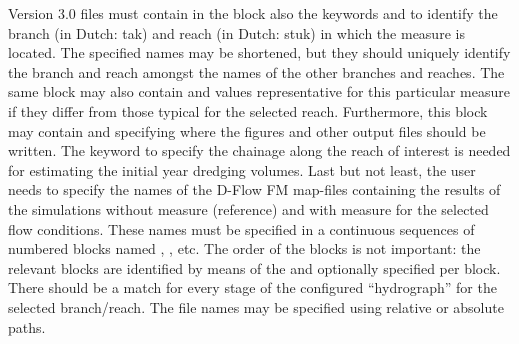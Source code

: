 Version 3.0 files must contain in the \keyw{[General]} block also the keywords  and  to identify the branch (in Dutch: tak) and reach (in Dutch: stuk) in which the measure is located.
The specified names may be shortened, but they should uniquely identify the branch and reach amongst the names of the other branches and reaches.
The same block may also contain  and  values representative for this particular measure if they differ from those typical for the selected reach.
Furthermore, this block may contain  and  specifying where the figures and other output files should be written.
The  keyword to specify the chainage along the reach of interest is needed for estimating the initial year dredging volumes.
Last but not least, the user needs to specify the names of the D-Flow FM map-files containing the results of the simulations without measure (reference) and with measure for the selected flow conditions.
These names must be specified in a continuous sequences of numbered blocks named , , etc.
The order of the blocks is not important: the relevant blocks are identified by means of the  and optionally  specified per block.
There should be a match for every stage of the configured ``hydrograph'' for the selected branch/reach.
The file names may be specified using relative or absolute paths.

